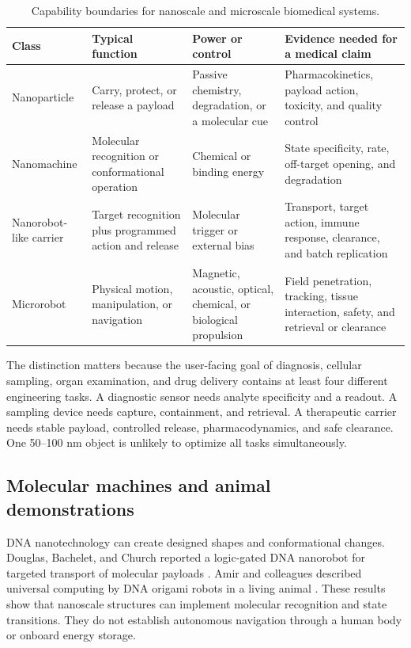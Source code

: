 \documentclass[conference]{IEEEtran}
\begin{document}
\begin{table}[t]
\centering
\caption{Capability boundaries for nanoscale and microscale biomedical systems.}
\label{tab:terms}
\setlength{\tabcolsep}{4pt}
\begin{tabular}{>{\raggedright\arraybackslash}p{}>{\raggedright\arraybackslash}p{}>{\raggedright\arraybackslash}p{}>{\raggedright\arraybackslash}p{}}
\toprule
Class & Typical function & Power or control & Evidence needed for a medical claim \\
\midrule
Nanoparticle & Carry, protect, or release a payload & Passive chemistry, degradation, or a molecular cue & Pharmacokinetics, payload action, toxicity, and quality control \\
Nanomachine & Molecular recognition or conformational operation & Chemical or binding energy & State specificity, rate, off-target opening, and degradation \\
Nanorobot-like carrier & Target recognition plus programmed action and release & Molecular trigger or external bias & Transport, target action, immune response, clearance, and batch replication \\
Microrobot & Physical motion, manipulation, or navigation & Magnetic, acoustic, optical, chemical, or biological propulsion & Field penetration, tracking, tissue interaction, safety, and retrieval or clearance \\
\bottomrule
\end{tabular}
\end{table}

The distinction matters because the user-facing goal of diagnosis, cellular sampling, organ examination, and drug delivery contains at least four different engineering tasks. A diagnostic sensor needs analyte specificity and a readout. A sampling device needs capture, containment, and retrieval. A therapeutic carrier needs stable payload, controlled release, pharmacodynamics, and safe clearance. One 50--100 nm object is unlikely to optimize all tasks simultaneously.

\subsection{Molecular machines and animal demonstrations}
DNA nanotechnology can create designed shapes and conformational changes. Douglas, Bachelet, and Church reported a logic-gated DNA nanorobot for targeted transport of molecular payloads \cite{douglas2012}. Amir and colleagues described universal computing by DNA origami robots in a living animal \cite{amir2014}. These results show that nanoscale structures can implement molecular recognition and state transitions. They do not establish autonomous navigation through a human body or onboard energy storage.
\end{document}
